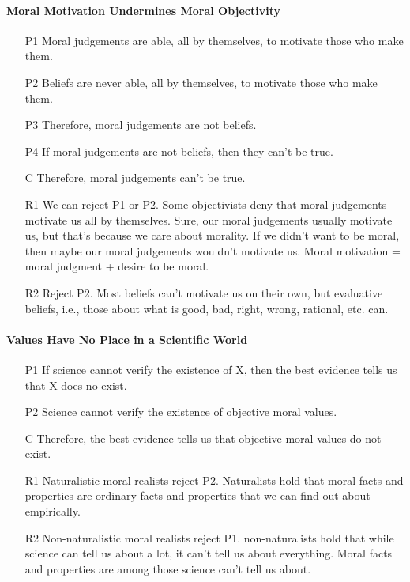 \documentclass[12pt]{article}
\begin{document}
\paragraph{Moral Motivation Undermines Moral Objectivity}
\begin{itemize}
    \item [P1] Moral judgements are able, all by themselves, to motivate those who make them.
    \item [P2] Beliefs are never able, all by themselves, to motivate those who make them.
    \item [P3] Therefore, moral judgements are not beliefs.
    \item [P4] If moral judgements are not beliefs, then they can't be true.
    \item [C] Therefore, moral judgements can't be true.
    \item [R1] We can reject P1 or P2. Some objectivists deny that moral judgements motivate us all by themselves. Sure, our moral judgements usually motivate us, but that's because we care about morality. If we didn't want to be moral, then maybe our moral judgements wouldn't motivate us. Moral motivation = moral judgment + desire to be moral.
    \item [R2] Reject P2. Most beliefs can't motivate us on their own, but evaluative beliefs, i.e., those about what is good, bad, right, wrong, rational, etc. can.
\end{itemize}

\paragraph{Values Have No Place in a Scientific World}
\begin{itemize}
    \item [P1] If science cannot verify the existence of X, then the best evidence tells us that X does no exist.
    \item [P2] Science cannot verify the existence of objective moral values.
    \item [C] Therefore, the best evidence tells us that objective moral values do not exist.
    \item [R1] Naturalistic moral realists reject P2. Naturalists hold that moral facts and properties are ordinary facts and properties that we can find out about empirically.
    \item [R2] Non-naturalistic moral realists reject P1. non-naturalists hold that while science can tell us about a lot, it can't tell us about everything. Moral facts and properties are among those science can't tell us about.
\end{itemize}
\end{document}
